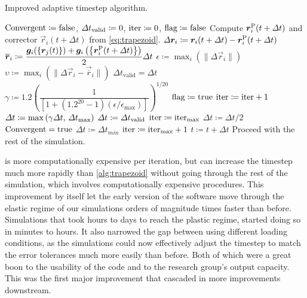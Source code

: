 \begin{algorithm}\label{alg:trapezoid_improved}
    \caption{Improved adaptive timestep algorithm.}
    \begin{algorithmic}
        \State $\textrm{Convergent} \coloneqq \textrm{false}$, $\Delta t_{\textrm{valid}} \coloneqq 0$, $\textrm{iter} \coloneqq 0$, $\textrm{flag} \coloneqq \textrm{false}$
        \State Compute $\vec{r}_i^{\rvar{P}}(t + \Delta t)$ and corrector $\vec{r}_i(t + \Delta t)$ from \cref{eq:trapezoid}.
        \State $\Delta \vec{r}_i \coloneqq \vec{r}_i(t + \Delta t) - \vec{r}_i^{\rvar{P}}(t + \Delta t)$
        \State $\vec{\overline{r}}_i \coloneqq \dfrac{\vec{g}_i(\left\{\vec{r}_j(t)\right\}) + \vec{g}_i\left(\left\{\vec{r}_i^{\rvar{P}}(t + \Delta t)\right\}\right)}{2}\Delta t$
        \State $\epsilon \coloneqq \max_i\left(\lVert \Delta \vec{r}_i \rVert \right)$
        \State $\upsilon \coloneqq \max_i\left(\lVert \Delta \vec{r}_i - \vec{\overline{r}}_i \rVert\right)$
        \State $\Delta t_{\textrm{valid}} = \Delta t$
        \State $\gamma \coloneqq 1.2\left(\dfrac{1}{\left[1 + (1.2^{20} - 1) (\epsilon / \epsilon_{\textrm{max}})\right]}\right)^{1/20}$
        \State $\textrm{flag} \coloneqq \textrm{true}$
        \State $\textrm{iter} \coloneqq \textrm{iter} + 1$
        \State $\Delta t \coloneqq \max\left(\gamma \Delta t,\, \Delta t_{\textrm{max}}\right)$
        \Else
        \State $\Delta t \coloneqq \Delta t_{\textrm{valid}}$
        \State $\textrm{iter} \coloneqq \textrm{iter}_{\textrm{max}}$
        \Else
        \State $\Delta t \coloneqq \Delta t / 2$
        \EndIf
        \EndIf
        \State $\textrm{Convergent} = \textrm{true}$
        \EndIf
        \State $\Delta t \coloneqq \Delta t_{min}$
        \State $\textrm{iter} \coloneqq \textrm{iter}_{\textrm{max}} + 1$
        \EndIf
        \EndWhile
        \State $t \coloneqq t + \Delta t$
        \State Proceed with the rest of the simulation.
    \end{algorithmic}
\end{algorithm}

 is more computationally expensive per iteration, but can increase the timestep much more rapidly than \cref{alg:trapezoid} without going through the rest of the simulation, which involves computationally expensive procedures. This improvement by itself let the early version of the software move through the elastic regime of our simulations orders of magnitude times faster than before. Simulations that took hours to days to reach the plastic regime, started doing so in minutes to hours. It also narrowed the gap between using different loading conditions, as the simulations could now effectively adjust the timestep to match the error tolerances much more easily than before. Both of which were a great boon to the usability of the code and to the research group's output capacity. This was the first major improvement that cascaded in more improvements downstream.

